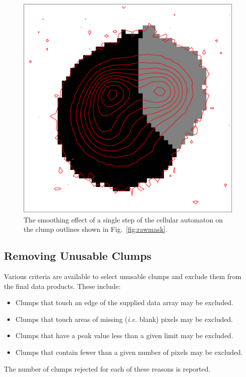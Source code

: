\documentclass[final,authoryear,5p,times,twocolumn]{elsarticle}
\begin{document}
\begin{figure}
\includegraphics[width=\columnwidth]{cleaned}
\caption{The smoothing effect of a single step of the cellular automaton
on the clump outlines shown in Fig.~\ref{fig:rawmask}.}
\label{fig:cleanedmask}
\end{figure}

\subsection{Removing Unusable Clumps}
Various criteria are available to select unusable clumps and exclude them
from the final data products. These include:

\begin{itemize}
\item Clumps that touch an edge of the supplied data array may be excluded.
\item Clumps that touch areas of missing (\emph{i.e.} blank) pixels may be excluded.
\item Clumps that have a peak value less than a given limit may be excluded.
\item Clumps that contain fewer than a given number of pixels may be excluded.
\end{itemize}

The number of clumps rejected for each of these reasons is reported.
\end{document}
